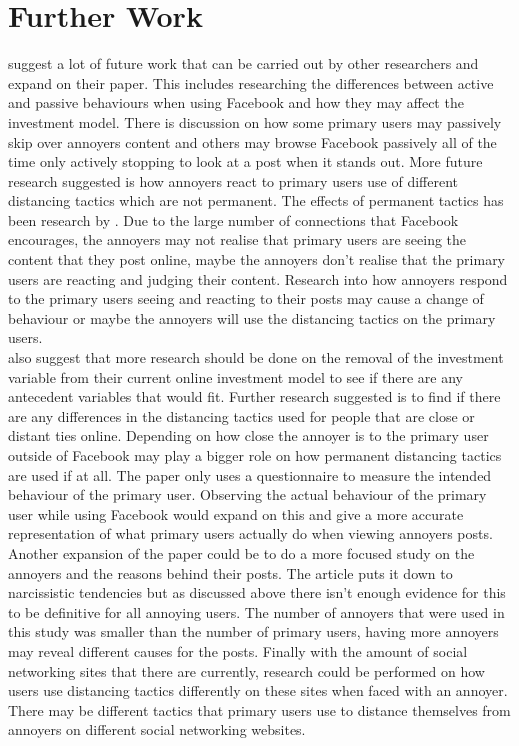 \documentclass[12pt]{article}
\begin{document}
\section{Further Work}
\cite{Carpenter} suggest a lot of future work that can be carried out by other researchers and expand on their paper. This includes researching the differences between active and passive behaviours when using Facebook and how they may affect the investment model. There is discussion on how some primary users may passively skip over annoyers content and others may browse Facebook passively all of the time only actively stopping to look at a post when it stands out. More future research suggested is how annoyers react to primary users use of different distancing tactics which are not permanent. The effects of permanent tactics has been research by \cite{Bevan}. Due to the large number of connections that Facebook encourages, the annoyers may not realise that primary users are seeing the content that they post online, maybe the annoyers don't realise that the primary users are reacting and judging their content. Research into how annoyers respond to the primary users seeing and reacting to their posts may cause a change of behaviour or maybe the annoyers will use the distancing tactics on the primary users. \\
\cite{Carpenter} also suggest that more research should be done on the removal of the investment variable from their current online investment model to see if there are any antecedent variables that would fit.
Further research suggested is to find if there are any differences in the distancing tactics used for people that are close or distant ties online. Depending on how close the annoyer is to the primary user outside of Facebook may play a bigger role on how permanent distancing tactics are used if at all.
The paper only uses a questionnaire to measure the intended behaviour of the primary user. Observing the actual behaviour of the primary user while using Facebook would expand on this and give a more accurate representation of what primary users actually do when viewing annoyers posts. \\
Another expansion of the paper could be to do a more focused study on the annoyers and the reasons behind their posts. The article puts it down to narcissistic tendencies but as discussed above there isn't enough evidence for this to be definitive for all annoying users. The number of annoyers that were used in this study was smaller than the number of primary users, having more annoyers may reveal different causes for the posts. Finally with the amount of social networking sites that there are currently, research could be performed on how users use distancing tactics differently on these sites when faced with an annoyer. There may be different tactics that primary users use to distance themselves from annoyers on different social networking websites. 



\end{document}
